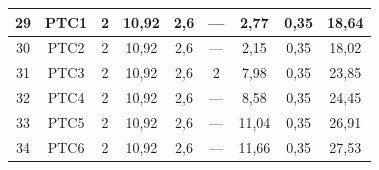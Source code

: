\documentclass[	DIV=calc,%
							paper=a4,%
							fontsize=12pt,%
							onecolumn]{scrartcl}	 					%
\begin{document}
\begin{tabular}{|c|c|c|c|c|c|c|c|c|}
	29                 & PTC1               & 2                                                    & 10,92                                       & 2,6                                           & ---                                           & 2,77                                             & 0,35                                            & 18,64                                                             \\ \hline
	30                 & PTC2               & 2                                                    & 10,92                                       & 2,6                                           & ---                                           & 2,15                                             & 0,35                                            & 18,02                                                             \\ \hline
	31                 & PTC3               & 2                                                    & 10,92                                       & 2,6                                           & 2                                             & 7,98                                             & 0,35                                            & 23,85                                                             \\ \hline
	32                 & PTC4               & 2                                                    & 10,92                                       & 2,6                                           & ---                                           & 8,58                                             & 0,35                                            & 24,45                                                             \\ \hline
	33                 & PTC5               & 2                                                    & 10,92                                       & 2,6                                           & ---                                           & 11,04                                            & 0,35                                            & 26,91                                                             \\ \hline
	34                 & PTC6               & 2                                                    & 10,92                                       & 2,6                                           & ---                                           & 11,66                                            & 0,35                                            & 27,53                                                             \\ \hline

\end{tabular}
\end{document}
